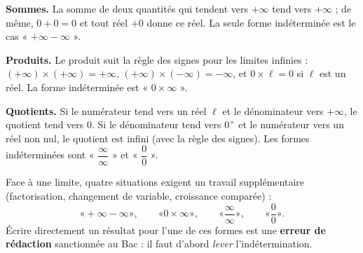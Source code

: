 \documentclass[11pt]{article}
\newcommand{\cle}[1]{{\popxbold\color{popdark}#1}}
\begin{document}
\textbf{Sommes.} La somme de deux quantités qui tendent vers $+\infty$ tend vers $+\infty$ ; de même, $0 + 0 = 0$ et tout réel $+ 0$ donne ce réel. La seule \cle{forme indéterminée} est le cas « $+\infty - \infty$ ».

\textbf{Produits.} Le produit suit la règle des signes pour les limites infinies : $(+\infty) \times (+\infty) = +\infty$, $(+\infty) \times (-\infty) = -\infty$, et $0 \times \ell = 0$ si $\ell$ est un réel. La forme indéterminée est « $0 \times \infty$ ».

\textbf{Quotients.} Si le numérateur tend vers un réel $\ell$ et le dénominateur vers $+\infty$, le quotient tend vers $0$. Si le dénominateur tend vers $0^+$ et le numérateur vers un réel non nul, le quotient est infini (avec la règle des signes). Les formes indéterminées sont « $\dfrac{\infty}{\infty}$ » et « $\dfrac{0}{0}$ ».

\begin{aretenir}
Face à une limite, quatre situations exigent un travail supplémentaire (factorisation, changement de variable, croissance comparée) :
\[ « +\infty - \infty », \qquad « 0 \times \infty », \qquad « \frac{\infty}{\infty} », \qquad « \frac{0}{0} ». \]
Écrire directement un résultat pour l'une de ces formes est une \textbf{erreur de rédaction} sanctionnée au Bac : il faut d'abord \emph{lever} l'indétermination.
\end{aretenir}
\end{document}
